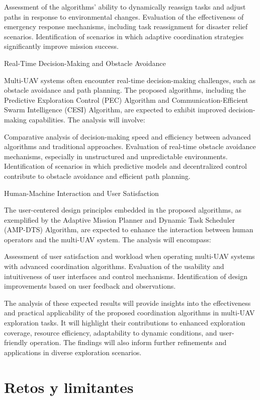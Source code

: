 \documentclass[sigconf]{acmart}
\begin{document}
    Assessment of the algorithms' ability to dynamically reassign tasks and adjust paths in response to environmental changes.
    Evaluation of the effectiveness of emergency response mechanisms, including task reassignment for disaster relief scenarios.
    Identification of scenarios in which adaptive coordination strategies significantly improve mission success.

Real-Time Decision-Making and Obstacle Avoidance

Multi-UAV systems often encounter real-time decision-making challenges, such as obstacle avoidance and path planning. The proposed algorithms, including the Predictive Exploration Control (PEC) Algorithm and Communication-Efficient Swarm Intelligence (CESI) Algorithm, are expected to exhibit improved decision-making capabilities. The analysis will involve:

    Comparative analysis of decision-making speed and efficiency between advanced algorithms and traditional approaches.
    Evaluation of real-time obstacle avoidance mechanisms, especially in unstructured and unpredictable environments.
    Identification of scenarios in which predictive models and decentralized control contribute to obstacle avoidance and efficient path planning.

Human-Machine Interaction and User Satisfaction

The user-centered design principles embedded in the proposed algorithms, as exemplified by the Adaptive Mission Planner and Dynamic Task Scheduler (AMP-DTS) Algorithm, are expected to enhance the interaction between human operators and the multi-UAV system. The analysis will encompass:

    Assessment of user satisfaction and workload when operating multi-UAV systems with advanced coordination algorithms.
    Evaluation of the usability and intuitiveness of user interfaces and control mechanisms.
    Identification of design improvements based on user feedback and observations.

    The analysis of these expected results will provide insights into the effectiveness and practical applicability of the proposed coordination algorithms in multi-UAV exploration tasks. It will highlight their contributions to enhanced exploration coverage, resource efficiency, adaptability to dynamic conditions, and user-friendly operation. The findings will also inform further refinements and applications in diverse exploration scenarios.
    
\section{Retos y limitantes}
\end{document}
